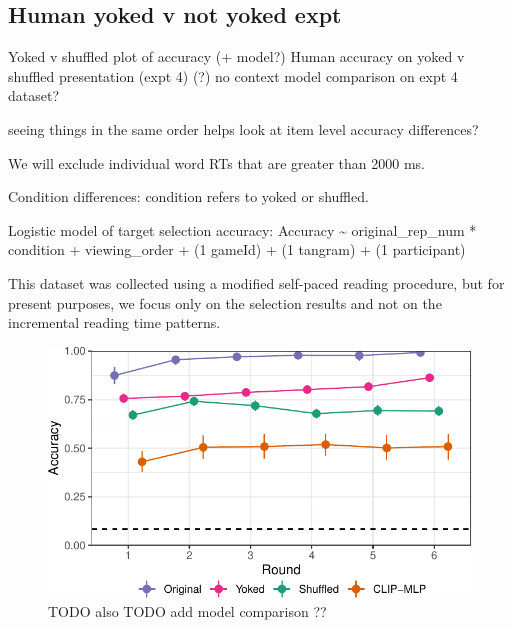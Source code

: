 \documentclass[10pt, letterpaper]{article}
\begin{document}
\subsection{Human yoked v not yoked
expt}\label{human-yoked-v-not-yoked-expt}

Yoked v shuffled plot of accuracy (+ model?) Human accuracy on yoked v
shuffled presentation (expt 4) (?) no context model comparison on expt 4
dataset?

seeing things in the same order helps look at item level accuracy
differences?

We will exclude individual word RTs that are greater than 2000 ms.

Condition differences: condition refers to yoked or shuffled.

Logistic model of target selection accuracy: Accuracy \textasciitilde{}
original\_rep\_num * condition + viewing\_order + (1 \textbar{} gameId)
+ (1 \textbar{} tangram) + (1 \textbar{} participant)

This dataset was collected using a modified self-paced reading
procedure, but for present purposes, we focus only on the selection
results and not on the incremental reading time patterns.

\begin{CodeChunk}
\begin{figure}[t]

{\centering \includegraphics[width=1\linewidth]{figs/fig-yoked-1} 

}

\caption[TODO also TODO add model comparison ?? \label{yoked}]{TODO also TODO add model comparison ?? \label{yoked}}\label{fig:fig-yoked}
\end{figure}
\end{CodeChunk}
\end{document}
